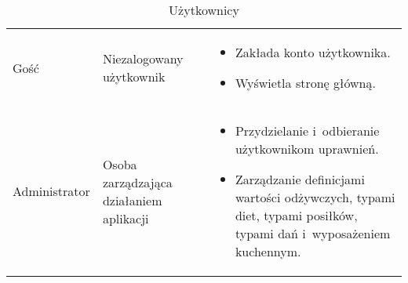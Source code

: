 \noindent\begin{minipage}{\textwidth}
    \begin{table}[H]
        \raggedright\caption{Użytkownicy\label{tabela:uzytkownicy}}
        \begin{center}\begin{tabular}{|P{.15\textwidth}|P{.25\textwidth}|P{.5\textwidth}|}

            \hline
             &  & \\

            \hline
            Gość &
            Niezalogowany użytkownik &
            \begin{itemize}
                \item Zakłada konto użytkownika.
                \item Wyświetla stronę główną.
            \end{itemize} \\
            \hline
            Administrator &
            Osoba zarządzająca działaniem aplikacji &
            \begin{itemize}
                \item Przydzielanie i~odbieranie użytkownikom uprawnień.
                \item Zarządzanie definicjami wartości odżywczych, typami diet, typami posiłków, typami dań i~wyposażeniem kuchennym.
            \end{itemize} \\
            \hline
        \end{tabular}\end{center}
        \raggedright\source{\ownwork}
        \vspace{0.75cm}
    \end{table}
\end{minipage}

\thispagestyle{normal}
